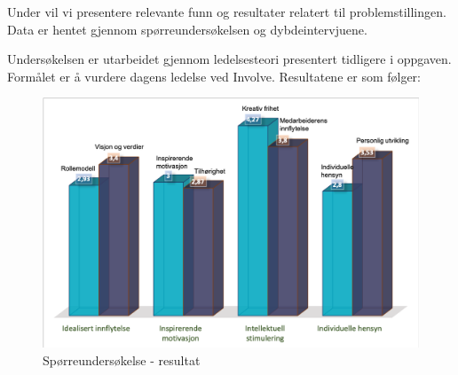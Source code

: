 Under vil vi presentere relevante funn og resultater relatert til problemstillingen. Data er hentet gjennom spørreundersøkelsen og dybdeintervjuene.

\indent \newline
Undersøkelsen er utarbeidet gjennom ledelsesteori presentert tidligere i oppgaven. Formålet er å vurdere dagens ledelse ved Involve. Resultatene er som følger:

\begin{figure}[H]
\centering
\includegraphics [scale=0.6]{bilder/resultat.png}
\caption{Spørreundersøkelse - resultat}
\label{fig:resultat}
\end{figure}

